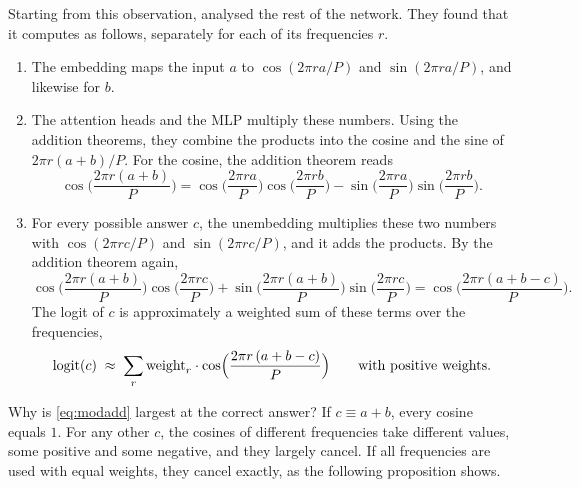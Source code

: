 Starting from this observation, \citet{nanda2023progress} analysed the rest of the network. They found that it
computes as follows, separately for each of its frequencies $r$.
\begin{enumerate}
\item The embedding maps the input $a$ to $\cos(2\pi ra/P)$ and $\sin(2\pi ra/P)$, and likewise for $b$.
\item The attention heads and the MLP multiply these numbers. Using the addition theorems, they combine the
products into the cosine and the sine of $2\pi r(a+b)/P$. For the cosine, the addition theorem reads
\[
\cos\!\Big(\frac{2\pi r(a+b)}{P}\Big)=\cos\!\Big(\frac{2\pi ra}{P}\Big)\cos\!\Big(\frac{2\pi rb}{P}\Big)
-\sin\!\Big(\frac{2\pi ra}{P}\Big)\sin\!\Big(\frac{2\pi rb}{P}\Big).
\]
\item For every possible answer $c$, the unembedding multiplies these two numbers with $\cos(2\pi rc/P)$ and
$\sin(2\pi rc/P)$, and it adds the products. By the addition theorem again,
\[
\cos\!\Big(\frac{2\pi r(a+b)}{P}\Big)\cos\!\Big(\frac{2\pi rc}{P}\Big)
+\sin\!\Big(\frac{2\pi r(a+b)}{P}\Big)\sin\!\Big(\frac{2\pi rc}{P}\Big)
=\cos\!\Big(\frac{2\pi r(a+b-c)}{P}\Big).
\]
The logit of $c$ is approximately a weighted sum of these terms over the frequencies,
\begin{equation}\label{eq:modadd}
\mathrm{logit}(c)\;\approx\;\sum_{r}\text{weight}_r\cdot\cos\!\Big(\frac{2\pi r\,(a+b-c)}{P}\Big)\qquad\text{with positive weights.}
\end{equation}
\end{enumerate}

Why is \eqref{eq:modadd} largest at the correct answer? If $c\equiv a+b$, every cosine equals $1$. For any other
$c$, the cosines of different frequencies take different values, some positive and some negative, and they largely
cancel. If all frequencies are used with equal weights, they cancel exactly, as the following proposition shows.

